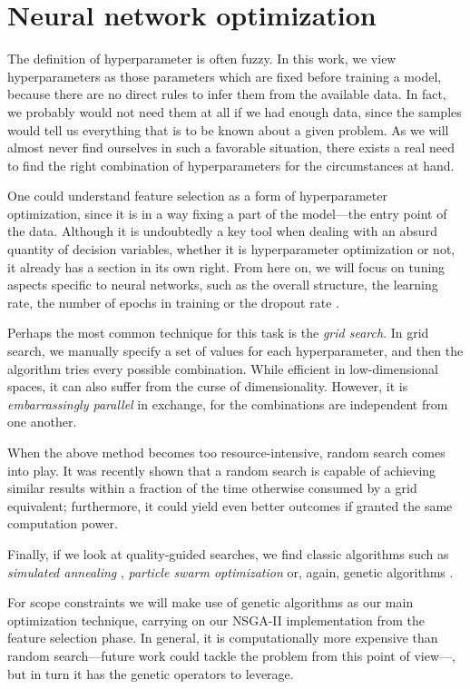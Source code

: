 \chapter{Neural network optimization}\label{ch:optimization}

The definition of hyperparameter is often fuzzy. In this work, we view hyperparameters as those parameters which are fixed before training a model, because there are no direct rules to infer them from the available data. In fact, we probably would not need them at all if we had enough data, since the samples would tell us everything that is to be known about a given problem. As we will almost never find ourselves in such a favorable situation, there exists a real need to find the right combination of hyperparameters for the circumstances at hand.

One could understand feature selection as a form of hyperparameter optimization, since it is in a way fixing a part of the model---the entry point of the data. Although it is undoubtedly a key tool when dealing with an absurd quantity of decision variables, whether it is hyperparameter optimization or not, it already has a section in its own right. From here on, we will focus on tuning aspects specific to neural networks, such as the overall structure, the learning rate, the number of epochs in training or the dropout rate \cite{srivastava2014dropout}.

Perhaps the most common technique for this task is the \textit{grid search}. In grid search, we manually specify a set of values for each hyperparameter, and then the algorithm tries every possible combination. While efficient in low-dimensional spaces, it can also suffer from the curse of dimensionality. However, it is \textit{embarrassingly parallel} in exchange, for the combinations are independent from one another.

When the above method becomes too resource-intensive, random search \cite{bergstra2012random} comes into play. It was recently shown that a random search is capable of achieving similar results within a fraction of the time otherwise consumed by a grid equivalent; furthermore, it could yield even better outcomes if granted the same computation power.

Finally, if we look at quality-guided searches, we find classic algorithms such as \textit{simulated annealing} \cite{pai2005support}, \textit{particle swarm optimization} \cite{lin2008particle} or, again, genetic algorithms \cite{leung2003tuning}.

For scope constraints we will make use of genetic algorithms as our main optimization technique, carrying on our \acs{NSGA-II} implementation from the feature selection phase. In general, it is computationally more expensive than random search---future work could tackle the problem from this point of view---, but in turn it has the genetic operators to leverage.